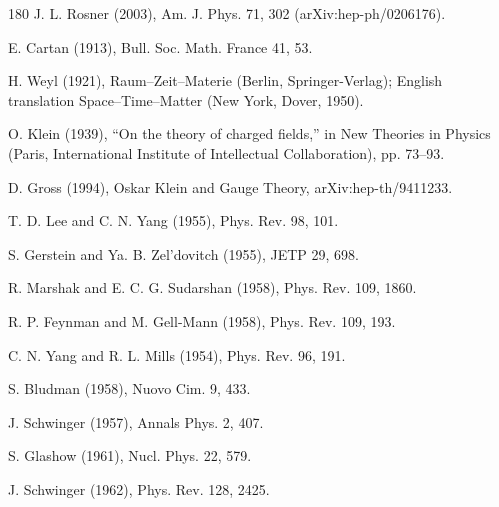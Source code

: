 \begin{thebibliography}{180}
 J. L. Rosner (2003), Am. J. Phys. 71, 302 (arXiv:hep-ph/0206176).

 E. Cartan (1913), Bull. Soc. Math. France 41, 53.

 H. Weyl (1921), Raum--Zeit--Materie (Berlin, Springer-Verlag); English translation Space--Time--Matter (New York, Dover, 1950).

 O. Klein (1939), ``On the theory of charged fields,'' in New Theories in Physics (Paris, International Institute of Intellectual Collaboration), pp. 73--93.

 D. Gross (1994), Oskar Klein and Gauge Theory, arXiv:hep-th/9411233.

 T. D. Lee and C. N. Yang (1955), Phys. Rev. 98, 101.

 S. Gerstein and Ya. B. Zel'dovitch (1955), JETP 29, 698.

 R. Marshak and E. C. G. Sudarshan (1958), Phys. Rev. 109, 1860.

 R. P. Feynman and M. Gell-Mann (1958), Phys. Rev. 109, 193.

 C. N. Yang and R. L. Mills (1954), Phys. Rev. 96, 191.

 S. Bludman (1958), Nuovo Cim. 9, 433.

 J. Schwinger (1957), Annals Phys. 2, 407.

 S. Glashow (1961), Nucl. Phys. 22, 579.

 J. Schwinger (1962), Phys. Rev. 128, 2425.


\end{thebibliography}
